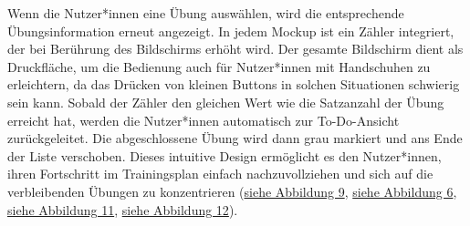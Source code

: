 Wenn die Nutzer*innen eine Übung auswählen, wird die entsprechende Übungsinformation erneut angezeigt. In jedem Mockup ist ein Zähler integriert, der bei Berührung des Bildschirms erhöht wird. Der gesamte Bildschirm dient als Druckfläche, um die Bedienung auch für Nutzer*innen mit Handschuhen zu erleichtern, da das Drücken von kleinen Buttons in solchen Situationen schwierig sein kann.
\newline
\newline
Sobald der Zähler den gleichen Wert wie die Satzanzahl der Übung erreicht hat, werden die Nutzer*innen automatisch zur To-Do-Ansicht zurückgeleitet. Die abgeschlossene Übung wird dann grau markiert und ans Ende der Liste verschoben. Dieses intuitive Design ermöglicht es den Nutzer*innen, ihren Fortschritt im Trainingsplan einfach nachzuvollziehen und sich auf die verbleibenden Übungen zu konzentrieren (\hyperref[fig:count1]{siehe Abbildung 9}, \hyperref[fig:todolist2]{siehe Abbildung 6}, \hyperref[fig:count3]{siehe Abbildung 11}, \hyperref[fig:count4]{siehe Abbildung 12}).

